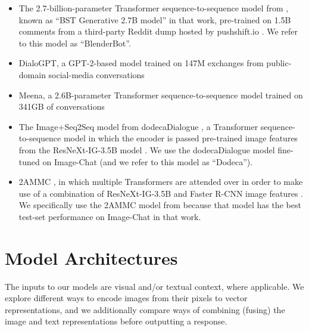 \documentclass[11pt,a4paper]{article}
\begin{document}
\begin{itemize}
  \item The 2.7-billion-parameter Transformer sequence-to-sequence model from \citet{roller2020recipes}, known as ``BST Generative 2.7B model'' in that work, pre-trained on 1.5B comments from a third-party Reddit dump hosted by pushshift.io \cite{baumgartner2020pushshift}. We refer to this model as ``BlenderBot''.
  \item DialoGPT, a GPT-2-based model trained on 147M exchanges from public-domain social-media conversations \citep{zhang2019dialogpt}
  \item Meena, a 2.6B-parameter Transformer sequence-to-sequence model trained on 341GB of conversations \citep{adiwardana2020meena}
  \item The Image+Seq2Seq model from dodecaDialogue \citep{shuster2019dialogue}, a Transformer sequence-to-sequence model in which the encoder is passed pre-trained image features from the ResNeXt-IG-3.5B model \citep{uru}. We use the dodecaDialogue model fine-tuned on Image-Chat (and we refer to this model as ``Dodeca'').
  \item 2AMMC \citep{ju2019allinone}, in which multiple Transformers are attended over in order to make use of a combination of ResNeXt-IG-3.5B and Faster R-CNN image features \citep{Detectron2018}. We specifically use the 2AMMC model from \citet{ju2019allinone} because that model has the best test-set performance on Image-Chat in that work.
\end{itemize}


\section{Model Architectures}
The inputs to our models are visual and/or textual context, where applicable. We explore different ways to encode images from their pixels to vector representations, and we additionally compare ways of combining (fusing) the image and text representations before outputting a response.
\end{document}
